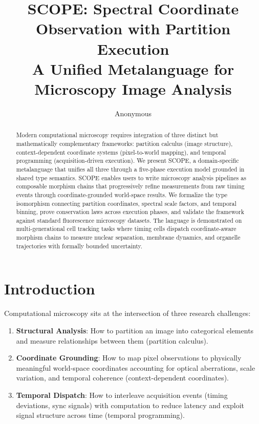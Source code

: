 \documentclass[11pt,twocolumn]{article}
\title{\textbf{SCOPE}: Spectral Coordinate Observation with Partition Execution \\
A Unified Metalanguage for Microscopy Image Analysis}
\author{Anonymous}
\date{}
\begin{document}
\maketitle

\begin{abstract}
Modern computational microscopy requires integration of three distinct but mathematically complementary frameworks: partition calculus (image structure), context-dependent coordinate systems (pixel-to-world mapping), and temporal programming (acquisition-driven execution). We present SCOPE, a domain-specific metalanguage that unifies all three through a five-phase execution model grounded in shared type semantics. SCOPE enables users to write microscopy analysis pipelines as composable morphism chains that progressively refine measurements from raw timing events through coordinate-grounded world-space results. We formalize the type isomorphism connecting partition coordinates, spectral scale factors, and temporal binning, prove conservation laws across execution phases, and validate the framework against standard fluorescence microscopy datasets. The language is demonstrated on multi-generational cell tracking tasks where timing cells dispatch coordinate-aware morphism chains to measure nuclear separation, membrane dynamics, and organelle trajectories with formally bounded uncertainty.
\end{abstract}

\section{Introduction}

Computational microscopy sits at the intersection of three research challenges:

\begin{enumerate}
\item \textbf{Structural Analysis}: How to partition an image into categorical elements and measure relationships between them (partition calculus).
\item \textbf{Coordinate Grounding}: How to map pixel observations to physically meaningful world-space coordinates accounting for optical aberrations, scale variation, and temporal coherence (context-dependent coordinates).
\item \textbf{Temporal Dispatch}: How to interleave acquisition events (timing deviations, sync signals) with computation to reduce latency and exploit signal structure across time (temporal programming).
\end{enumerate}
\end{document}
